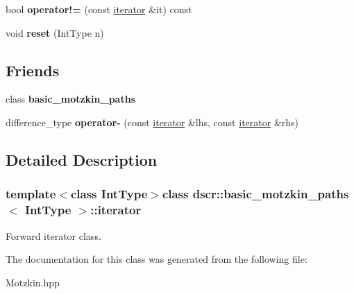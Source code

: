 \begin{DoxyCompactItemize}
\item 
\hypertarget{classdscr_1_1basic__motzkin__paths_1_1iterator_ac85ddedcb5d359644719845b7cdf50b2}{bool {\bfseries operator!=} (const \hyperlink{classdscr_1_1basic__motzkin__paths_1_1iterator}{iterator} \&it) const }\label{classdscr_1_1basic__motzkin__paths_1_1iterator_ac85ddedcb5d359644719845b7cdf50b2}

\item 
\hypertarget{classdscr_1_1basic__motzkin__paths_1_1iterator_a2ab5b9ee66e7f2c35f0677302e4c1eec}{void {\bfseries reset} (Int\-Type n)}\label{classdscr_1_1basic__motzkin__paths_1_1iterator_a2ab5b9ee66e7f2c35f0677302e4c1eec}

\end{DoxyCompactItemize}
\subsection*{Friends}
\begin{DoxyCompactItemize}
\item 
\hypertarget{classdscr_1_1basic__motzkin__paths_1_1iterator_a10f18ca4bc542cce6d550bde99c07908}{class {\bfseries basic\-\_\-motzkin\-\_\-paths}}\label{classdscr_1_1basic__motzkin__paths_1_1iterator_a10f18ca4bc542cce6d550bde99c07908}

\item 
\hypertarget{classdscr_1_1basic__motzkin__paths_1_1iterator_a4304f5d7bb1d12de2d2ad2c1e4e64dab}{difference\-\_\-type {\bfseries operator-\/} (const \hyperlink{classdscr_1_1basic__motzkin__paths_1_1iterator}{iterator} \&lhs, const \hyperlink{classdscr_1_1basic__motzkin__paths_1_1iterator}{iterator} \&rhs)}\label{classdscr_1_1basic__motzkin__paths_1_1iterator_a4304f5d7bb1d12de2d2ad2c1e4e64dab}

\end{DoxyCompactItemize}


\subsection{Detailed Description}
\subsubsection*{template$<$class Int\-Type$>$class dscr\-::basic\-\_\-motzkin\-\_\-paths$<$ Int\-Type $>$\-::iterator}

Forward iterator class. 

The documentation for this class was generated from the following file\-:\begin{DoxyCompactItemize}
\item 
Motzkin.\-hpp\end{DoxyCompactItemize}
